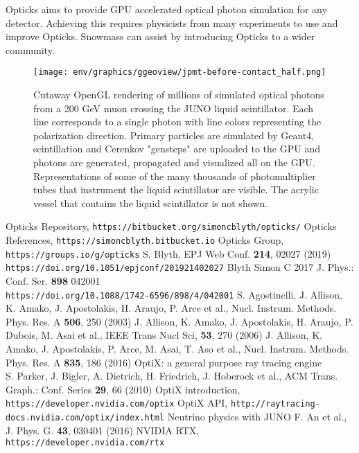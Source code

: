 \documentclass{webofc}
\begin{document}
Opticks aims to provide GPU accelerated optical photon simulation for any detector.
Achieving this requires physicists from many experiments to use and improve Opticks.
Snowmass can assist by introducing Opticks to a wider community.
%
%
%
%
%
\newpage
%
%
\begin{figure}
\centering
\texttt{[image: env/graphics/ggeoview/jpmt-before-contact\_half.png]}
\caption{Cutaway OpenGL rendering of millions of simulated optical photons from a 200 GeV muon crossing the JUNO liquid scintillator. 
Each line corresponds to a single photon with line colors representing the polarization direction. Primary particles
are simulated by Geant4, scintillation and Cerenkov "gensteps" are uploaded to the GPU and photons are generated, propagated
and visualized all on the GPU. Representations of some of the many thousands of photomultiplier tubes that instrument the liquid scintillator are visible.
The acrylic vessel that contains the liquid scintillator is not shown.
}
\label{problem}
\end{figure}%
%
\begin{thebibliography}{}
%
Opticks Repository, {\tt https://bitbucket.org/simoncblyth/opticks/}
Opticks References, {\tt https://simoncblyth.bitbucket.io}
Opticks Group, {\tt https://groups.io/g/opticks}
S. Blyth, EPJ Web Conf. {\bf 214}, 02027 (2019) \\
{\tt https://doi.org/10.1051/epjconf/201921402027}
Blyth Simon C 2017 J. Phys.: Conf. Ser. {\bf 898} 042001 \\
{\tt https://doi.org/10.1088/1742-6596/898/4/042001}
%
%
%
S. Agostinelli, J. Allison, K. Amako, J. Apostolakis, H. Araujo, P. Arce et al., Nucl. Instrum. Methods. Phys. Res. A {\bf 506}, 250 (2003)
J. Allison, K. Amako, J. Apostolakis, H. Araujo, P. Dubois, M. Asai et al., IEEE Trans Nucl Sci, {\bf 53}, 270 (2006)
J. Allison, K. Amako, J. Apostolakis, P. Arce, M. Asai, T. Aso et al., Nucl. Instrum. Methods. Phys. Res. A {\bf 835}, 186 (2016)
%
%
%
OptiX: a general purpose ray tracing engine \\
S. Parker, J. Bigler, A. Dietrich, H. Friedrich, J. Hoberock et al., ACM Trans. Graph.: Conf. Series {\bf 29}, 66 (2010)
OptiX introduction, {\tt https://developer.nvidia.com/optix}
OptiX API, {\tt http://raytracing-docs.nvidia.com/optix/index.html}
Neutrino physics with JUNO 
F. An et al., J. Phys. G. {\bf 43}, 030401 (2016) 
NVIDIA RTX, {\tt https://developer.nvidia.com/rtx}
%
%

\end{thebibliography}





%
\end{document}
